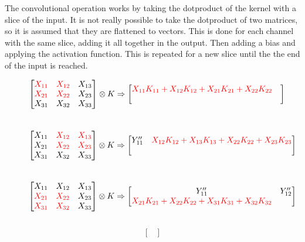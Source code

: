 The convolutional operation works by taking the dotproduct of the kernel with a slice of the input. It is not really possible to take the dotproduct of two matrices, so it is assumed that they are flattened to vectors.  This is done for each channel with the same slice, adding it all together in the output. Then adding a bias and applying the activation function. This is repeated for a new slice until the the end of the input is reached.

\begin{figure}
    \centering
    $$\begin{bmatrix}
        \color{red} X_{11} & \color{red} X_{12} & X_{13} \\
        \color{red} X_{21} & \color{red} X_{22} & X_{23} \\
        X_{31} & X_{32} & X_{33} 
    \end{bmatrix} \otimes K \Rightarrow \begin{bmatrix}
        \color{red} X_{11} K_{11} + X_{12} K_{12} + X_{21} K_{21} + X_{22} K_{22} & \\
         &
    \end{bmatrix}$$\\
    $$\begin{bmatrix}
        X_{11} & \color{red} X_{12} & \color{red} X_{13} \\
        X_{21} & \color{red} X_{22} & \color{red} X_{23} \\
        X_{31} & X_{32} & X_{33} 
    \end{bmatrix} \otimes K \Rightarrow \begin{bmatrix}
         Y''_{11} &\color{red} X_{12} K_{12} + X_{13} K_{13} + X_{22} K_{22} + X_{23} K_{23} \\
         &
    \end{bmatrix}$$\\
    $$\begin{bmatrix}
        X_{11} & X_{12} & X_{13} \\
        \color{red} X_{21} & \color{red} X_{22} & X_{23} \\
        \color{red} X_{31} & \color{red} X_{32} & X_{33}
    \end{bmatrix} \otimes K \Rightarrow \begin{bmatrix}
        Y''_{11} & Y''_{12} \\
        \color{red} X_{21} K_{21} + X_{22} K_{22} + X_{31} K_{31} + X_{32} K_{32} & 
    \end{bmatrix}$$\\
    $$\begin{bmatrix}

\end{bmatrix}$$
\end{figure}
